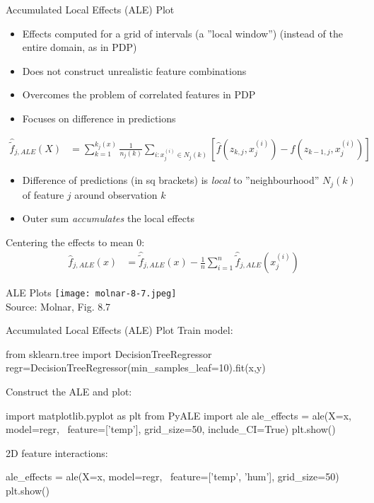 \documentclass[ignorenonframetext,xcolor=x11names]{beamer}
\begin{document}
\begin{frame}[fragile]{Accumulated Local Effects (ALE) Plot}
\begin{itemize}
   \item Effects computed for a grid of intervals (a ''local window'') (instead of the entire domain, as in PDP)
   \item Does not construct unrealistic feature combinations
   \item Overcomes the problem  of correlated features in PDP
   \item Focuses on difference in predictions
\end{itemize}
\begin{align*}
\hat{\tilde{f}}_{j, ALE}(X) &= \sum_{k=1}^{k_j(x)} \frac{1}{n_j(k)} \sum_{i:x_j^{(i)} \in N_j(k)} \left[\hat{f}(z_{k, j}, x^{(i)}_j) - \hat{f} (z_{k-1, j},x^{(i)}_j) \right]
\end{align*}
\begin{itemize}
   \item Difference of predictions (in sq brackets) is \emph{local} to ''neighbourhood'' $N_j(k)$ of feature $j$ around observation $k$
   \item Outer sum \emph{accumulates} the local effects
\end{itemize}
Centering the effects to mean 0:
\begin{align*}
\hat{f}_{j, ALE}(x) &= \hat{\tilde{f}}_{j, ALE} (x) - \frac{1}{n} \sum_{i=1}^n \hat{\tilde{f}}_{j, ALE}(x_j^{(i)})
\end{align*}
\end{frame}

\begin{frame}{ALE Plots}
\centering
\texttt{[image: molnar-8-7.jpeg]} \\

\scriptsize Source: Molnar, Fig. 8.7
\end{frame}

\begin{frame}[fragile]{Accumulated Local Effects (ALE) Plot}
Train model:
\begin{pythoncode}
from sklearn.tree import DecisionTreeRegressor
regr=DecisionTreeRegressor(min_samples_leaf=10).fit(x,y)
\end{pythoncode}
Construct the ALE and plot:
\begin{pythoncode}
import matplotlib.pyplot as plt
from PyALE import ale
ale_effects = ale(X=x, model=regr, \
    feature=['temp'], grid_size=50, include_CI=True)
plt.show()
\end{pythoncode}
2D feature interactions:
\begin{pythoncode}
ale_effects = ale(X=x, model=regr, \
    feature=['temp', 'hum'], grid_size=50)
plt.show()
\end{pythoncode}
\end{frame}
\end{document}
